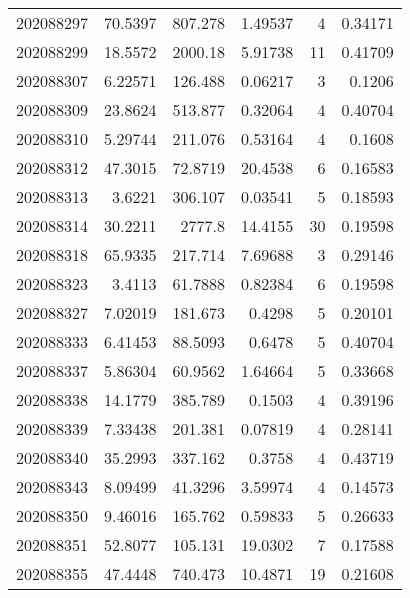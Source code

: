 \begin{tabular}{rrrrrr}
 202088297 &         70.5397  &      807.278  &            1.49537 &           4 & 0.34171 \\
 202088299 &         18.5572  &     2000.18   &            5.91738 &          11 & 0.41709 \\
 202088307 &          6.22571 &      126.488  &            0.06217 &           3 & 0.1206  \\
 202088309 &         23.8624  &      513.877  &            0.32064 &           4 & 0.40704 \\
 202088310 &          5.29744 &      211.076  &            0.53164 &           4 & 0.1608  \\
 202088312 &         47.3015  &       72.8719 &           20.4538  &           6 & 0.16583 \\
 202088313 &          3.6221  &      306.107  &            0.03541 &           5 & 0.18593 \\
 202088314 &         30.2211  &     2777.8    &           14.4155  &          30 & 0.19598 \\
 202088318 &         65.9335  &      217.714  &            7.69688 &           3 & 0.29146 \\
 202088323 &          3.4113  &       61.7888 &            0.82384 &           6 & 0.19598 \\
 202088327 &          7.02019 &      181.673  &            0.4298  &           5 & 0.20101 \\
 202088333 &          6.41453 &       88.5093 &            0.6478  &           5 & 0.40704 \\
 202088337 &          5.86304 &       60.9562 &            1.64664 &           5 & 0.33668 \\
 202088338 &         14.1779  &      385.789  &            0.1503  &           4 & 0.39196 \\
 202088339 &          7.33438 &      201.381  &            0.07819 &           4 & 0.28141 \\
 202088340 &         35.2993  &      337.162  &            0.3758  &           4 & 0.43719 \\
 202088343 &          8.09499 &       41.3296 &            3.59974 &           4 & 0.14573 \\
 202088350 &          9.46016 &      165.762  &            0.59833 &           5 & 0.26633 \\
 202088351 &         52.8077  &      105.131  &           19.0302  &           7 & 0.17588 \\
 202088355 &         47.4448  &      740.473  &           10.4871  &          19 & 0.21608 \\

\end{tabular}
